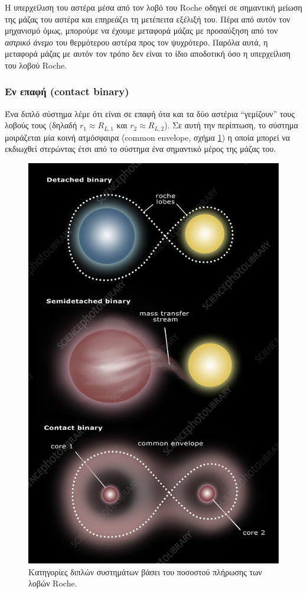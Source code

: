 Η υπερχείλιση του αστέρα μέσα από τον λοβό του Roche οδηγεί σε σημαντική μείωση της μάζας του αστέρα και επηρεάζει τη μετέπειτα εξέλιξή του. Πέρα από αυτόν τον μηχανισμό όμως, μπορούμε να έχουμε μεταφορά μάζας με προσαύξηση από τον \textit{αστρικό άνεμο} του θερμότερου αστέρα προς τον ψυχρότερο. Παρόλα αυτά, η μεταφορά μάζας με αυτόν τον τρόπο δεν είναι το ίδιο αποδοτική όσο η υπερχείλιση του λοβού Roche.

\subsubsection{Εν επαφή (contact binary)}
Ένα διπλό σύστημα λέμε ότι είναι σε επαφή ότα και τα δύο αστέρια ``γεμίζουν'' τους λοβούς τους (δηλαδή $r_1 \approx R_{L,1}$ και $r_2 \approx R_{L,2}$). Σε αυτή την περίπτωση, το σύστημα μοιράζεται μία κοινή ατμόσφαιρα (common envelope, σχήμα \ref{fig:binary_cases}) η οποία μπορεί να εκδιωχθεί στερώντας έτσι από το σύστημα ένα σημαντικό μέρος της μάζας του.

\begin{figure}
    \centering
    \includegraphics[scale=0.3]{Figures/binary_cases.jpeg}
    \caption{Κατηγορίες διπλών συστημάτων βάσει του ποσοστού πλήρωσης των λοβών Roche.}
    \label{fig:binary_cases}
\end{figure}

